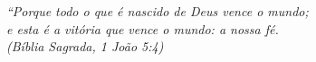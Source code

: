 \begin{epigrafe}
    \vspace*{\fill}
	\begin{flushright}
		\textit{``Porque todo o que é nascido de Deus vence o mundo; \\
		e esta é a vitória que vence o mundo: a nossa fé. \\
		(Bíblia Sagrada, 1 João 5:4)}
	\end{flushright}
\end{epigrafe}
